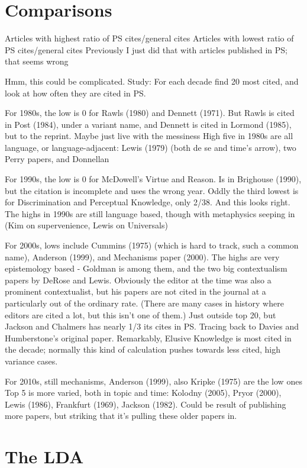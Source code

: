 \documentclass[
  10pt,
  letterpaper,
  DIV=11,
  numbers=noendperiod,
  twoside]{scrartcl}
\begin{document}
\section{Comparisons}\label{comparisons}

Articles with highest ratio of PS cites/general cites Articles with
lowest ratio of PS cites/general cites Previously I just did that with
articles published in PS; that seems wrong

Hmm, this could be complicated. Study: For each decade find 20 most
cited, and look at how often they are cited in PS.

For 1980s, the low is 0 for Rawls (1980) and Dennett (1971). But Rawls
is cited in Post (1984), under a variant name, and Dennett is cited in
Lormond (1985), but to the reprint. Maybe just live with the messiness
High five in 1980s are all language, or language-adjacent: Lewis (1979)
(both de se and time's arrow), two Perry papers, and Donnellan

For 1990s, the low is 0 for McDowell's Virtue and Reason. Is in
Brighouse (1990), but the citation is incomplete and uses the wrong
year. Oddly the third lowest is for Discrimination and Perceptual
Knowledge, only 2/38. And this looks right. The highs in 1990s are still
language based, though with metaphysics seeping in (Kim on
supervenience, Lewis on Universals)

For 2000s, lows include Cummins (1975) (which is hard to track, such a
common name), Anderson (1999), and Mechanisms paper (2000). The highs
are very epistemology based - Goldman is among them, and the two big
contextualism papers by DeRose and Lewis. Obviously the editor at the
time was also a prominent contextualist, but his papers are not cited in
the journal at a particularly out of the ordinary rate. (There are many
cases in history where editors are cited a lot, but this isn't one of
them.) Just outside top 20, but Jackson and Chalmers has nearly 1/3 its
cites in PS. Tracing back to Davies and Humberstone's original paper.
Remarkably, Elusive Knowledge is most cited in the decade; normally this
kind of calculation pushes towards less cited, high variance cases.

For 2010s, still mechanisms, Anderson (1999), also Kripke (1975) are the
low ones Top 5 is more varied, both in topic and time: Kolodny (2005),
Pryor (2000), Lewis (1986), Frankfurt (1969), Jackson (1982). Could be
result of publishing more papers, but striking that it's pulling these
older papers in.

\section{The LDA}\label{the-lda}
\end{document}
